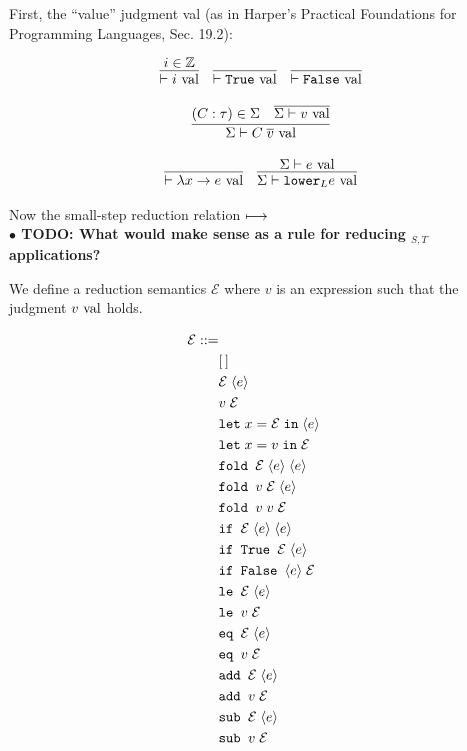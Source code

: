 \documentclass[10pt]{article}
\begin{document}
First, the ``value'' judgment val (as in Harper's Practical Foundations for Programming Languages, Sec. 19.2):

\[
  \begin{array}{cc}
    \infer{\vdash i \val}{i \in \mathbb{Z}}
    ~~~
    \infer{\vdash \True \val}{}
    ~~~
    \infer{\vdash \False \val}{}
    \\\\
    \infer{\Sigma \vdash C\; \overline{v} \val}{(C : \tau) \in \Sigma & \overline{\Sigma \vdash v \val}}
    \\\\
    \infer{\vdash \lambda x \ra e \val}{}
    ~~~
    \infer{\Sigma \vdash \lowerS{L} e \val}{\Sigma \vdash e \val}
  \end{array}
\]

\noindent
Now the small-step reduction relation $\longmapsto$\\

\textbf{$\bullet$ TODO: What would make sense as a rule for reducing $_{S,T}$ applications?}

We define a reduction semantics $\mathcal{E}$ where $v$ is an expression such that the judgment $v \textnormal{ val}$ holds.

{\footnotesize
\begin{align*}
  \mathcal{E} ::=\\
    &[\,]\\
    &\mathcal{E}\; \langle e \rangle\\
    &v\; \mathcal{E}\\
    &\texttt{let}\; x = \mathcal{E}\; \texttt{in}\; \langle e \rangle\\
    &\texttt{let}\; x = v\; \texttt{in}\; \mathcal{E}\\
    &\texttt{fold } \mathcal{E}\; \langle e \rangle\; \langle e \rangle\\
    &\texttt{fold } v\; \mathcal{E}\; \langle e \rangle\\
    &\texttt{fold } v\; v\; \mathcal{E}\\
    &\texttt{if } \mathcal{E}\; \langle e \rangle\; \langle e \rangle\\
    &\texttt{if True } \mathcal{E}\; \langle e \rangle\\
    &\texttt{if False } \langle e \rangle\; \mathcal{E}\\
    &\texttt{le } \mathcal{E}\; \langle e \rangle\\
    &\texttt{le } v\; \mathcal{E}\\
    &\texttt{eq } \mathcal{E}\; \langle e \rangle\\
    &\texttt{eq } v\; \mathcal{E}\\
    &\texttt{add } \mathcal{E}\; \langle e \rangle\\
    &\texttt{add } v\; \mathcal{E}\\
    &\texttt{sub } \mathcal{E}\; \langle e \rangle\\
    &\texttt{sub } v\; \mathcal{E}\\
\end{align*}
}
\end{document}
